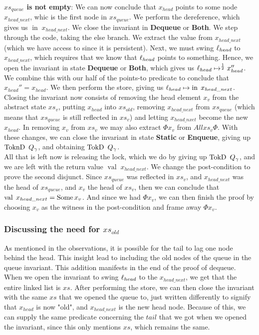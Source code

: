 \documentclass[twoside,11pt,openright]{report}
\newcommand{\nIn}[1]{\operatorname{in} \; #1}
\newcommand{\nVal}[1]{\operatorname{val} \; #1}
\newcommand{\StaticState}{\textbf{Static}}
\newcommand{\EnqueueState}{\textbf{Enqueue}}
\newcommand{\DequeueState}{\textbf{Dequeue}}
\newcommand{\BothState}{\textbf{Both}}
\newcommand{\Qg}{Q_\gname}
\newcommand{\TokD}[1]{\operatorname{TokD}\ #1}
\newcommand{\TokDQg}{\TokD{\Qg}}
\newcommand{\ToknD}[1]{\operatorname{ToknD}\ #1}
\newcommand{\ToknDQg}{\ToknD{\Qg}}
\begin{document}
\textbf{$xs_{queue}$ is not empty}:
We can now conclude that $x_{head}$ points to some node $x_{head\_next}$, whic is the first node in $xs_{queue}$. We perform the dereference, which gives us $\nIn{x_{head\_next}}$. We close the invariant in \DequeueState{} or \BothState{}. We step through the code, taking the else branch. We extract the value from $x_{head\_next}$ (which we have access to since it is persistent). Next, we must swing $\ell_{head}$ to $x_{head\_next}$, which requires that we know that $\ell_{head}$ points to something. Hence, we open the invariant in state \DequeueState{} or \BothState{}, which gives us $\ell_{head} \mapsto^{\frac{1}{2}} x_{head}''$. We combine this with our half of the points-to predicate to conclude that $x_{head}'' = x_{head}$. We then perform the store, giving us $\loc_{head} \mapsto \nIn{x_{head\_next}}$. Closing the invariant now consists of removing the head element $x_v$ from the abstract state $xs_v$, putting $x_{head}$ into $xs_{old}$, removing $x_{head\_next}$ from $xs_{queue}$ (which means that $xs_{queue}$ is still reflected in $xs_{v}$) and letting $x_{head\_nxet}$ become the new $x_{head}$. In removing $x_v$ from $xs_v$ we may also extract $\Phi x_v$ from $All xs_v \Phi$. With these changes, we can close the invariant in state \StaticState{} or \EnqueueState{}, giving up $\ToknDQg$, and obtaining $\TokDQg$.\\
All that is left now is releasing the lock, which we do by giving up $\TokDQg$, and we are left with the return value $\nVal{x_{head\_next}}$. We change the post-condition to prove the second disjunct. Since $xs_{queue}$ was reflected in $xs_v$, and $x_{head\_next}$ was the head of $xs_{queue}$, and $x_v$ the head of $xs_v$, then we can conclude that $\nVal{x_{head\_next}} = \Some x_v$. And since we had $\Phi x_v$, we can then finish the proof by choosing $x_v$ as the witness in the post-condition and frame away $\Phi x_v$.

\subsubsection{Discussing the need for $xs_{old}$}\label{MSQTL:Discussion:xs_old}

As mentioned in the observations, it is possible for the tail to lag one node behind the head. This insight lead to including the old nodes of the queue in the queue invariant. This addition manifests in the end of the proof of dequeue. When we open the invariant to swing $\ell_{head}$ to the $x_{head\_next}$, we get that the entire linked list is $xs$. After performing the store, we can then close the invariant with the same $xs$ that we opened the queue to, just written differently to signify that $x_{head}$ is now "old", and $x_{head\_next}$ is the new head node. Because of this, we can supply the same predicate concerning the $tail$ that we got when we opened the invariant, since this only mentions $xs$, which remains the same.
\end{document}

